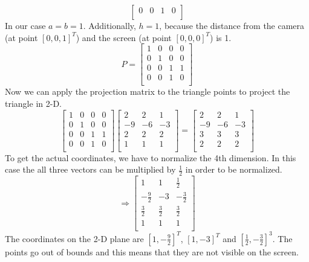 \documentclass[a4paper]{article}
\begin{document}
\begin{enumerate}[label=(\alph*)]
\[\begin{bmatrix}
    0&0&1&0\\
    \end{bmatrix}\]
    In our case $a=b=1$. Additionally, $h=1$, because the distance from the camera (at point $[0, 0, 1]^T$) and the screen (at point $[0, 0, 0]^T$) is 1.
    \[P=\begin{bmatrix}
    1&0&0&0\\
    0&1&0&0\\
    0&0&1&1\\
    0&0&1&0\\
    \end{bmatrix}\]
    Now we can apply the projection matrix to the triangle points to project the triangle in 2-D.
    \[\begin{bmatrix}
    1&0&0&0\\
    0&1&0&0\\
    0&0&1&1\\
    0&0&1&0\\
    \end{bmatrix}
    \begin{bmatrix}
    2&2&1\\
    -9&-6&-3\\
    2&2&2\\
    1&1&1\\
    \end{bmatrix}
    =\begin{bmatrix}
    2&2&1\\
    -9&-6&-3\\
    3&3&3\\
    2&2&2\\
    \end{bmatrix}
    \]
    To get the actual coordinates, we have to normalize the 4th dimension. In this case the all three vectors can be multiplied by $\frac{1}{2}$ in order to be normalized.
    \[\Rightarrow\begin{bmatrix}
    1&1&\frac{1}{2}\\
    -\frac{9}{2}&-3&-\frac{3}{2}\\
    \frac{3}{2}&\frac{3}{2}&\frac{3}{2}\\
    1&1&1\\
    \end{bmatrix}\]
    The coordinates on the 2-D plane are $[1, -\frac{9}{2}]^T$, $[1, -3]^T$ and $[\frac{1}{2}, -\frac{3}{2}]^3$. The points go out of bounds and this means that they are not visible on the screen.
\end{enumerate}
\end{document}
